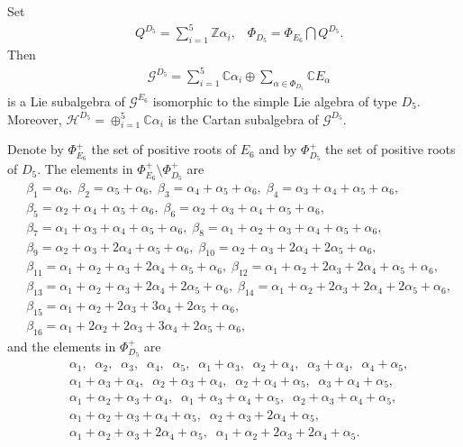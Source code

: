 \documentclass[12pt]{article}
\numberwithin{equation}{section}
\theoremstyle{definition}
\theoremstyle{remark}
\begin{document}
Set
\begin{eqnarray}
	&Q^{D_5}=\sum\limits_{i=1}^5\mathbb{Z}\alpha_i,\;\;\;\Phi_{D_5}=\Phi_{E_6}\bigcap Q^{D_5}.
\end{eqnarray}
Then
\begin{eqnarray}
	&\mathscr{G}^{D_5}=\sum\limits_{i=1}^5\mathbb{C}\alpha_i\oplus\sum\limits_{\alpha\in\Phi_{D_5}}\mathbb{C}E_{\alpha}
\end{eqnarray}
is a Lie subalgebra of $\mathscr{G}^{E_6}$ isomorphic to the simple Lie algebra of type $D_5$. Moreover, $\mathscr{H}^{D_5}=\oplus_{i=1}^5\mathbb{C}\alpha_i$ is the Cartan subalgebra of $\mathscr{G}^{D_5}$.

Denote by $\Phi_{E_6}^+$ the set of positive roots of $E_6$ and by $\Phi_{D_5}^+$ the set of positive roots of $D_5$. The elements in $\Phi^+_{E_6}\setminus\Phi^+_{D_5}$ are
\begin{eqnarray}
	&\beta_1=\alpha_6,\;\beta_2=\alpha_5+\alpha_6,\;\beta_3=\alpha_4+\alpha_5+\alpha_6,\;\beta_4=\alpha_3+\alpha_4+\alpha_5+\alpha_6,\label{2.29}\\
	&\beta_5=\alpha_2+\alpha_4+\alpha_5+\alpha_6,\;\beta_6=\alpha_2+\alpha_3+\alpha_4+\alpha_5+\alpha_6,\\
	&\beta_7=\alpha_1+\alpha_3+\alpha_4+\alpha_5+\alpha_6,\;\beta_8=\alpha_1+\alpha_2+\alpha_3+\alpha_4+\alpha_5+\alpha_6,\\
	&\beta_9=\alpha_2+\alpha_3+2\alpha_4+\alpha_5+\alpha_6,\;\beta_{10}=\alpha_2+\alpha_3+2\alpha_4+2\alpha_5+\alpha_6,\\
	&\beta_{11}=\alpha_1+\alpha_2+\alpha_3+2\alpha_4+\alpha_5+\alpha_6,\;\beta_{12}=\alpha_1+\alpha_2+2\alpha_3+2\alpha_4+\alpha_5+\alpha_6,\\
	&\beta_{13}=\alpha_1+\alpha_2+\alpha_3+2\alpha_4+2\alpha_5+\alpha_6,\;\beta_{14}=\alpha_1+\alpha_2+2\alpha_3+2\alpha_4+2\alpha_5+\alpha_6,\\
	&\beta_{15}=\alpha_1+\alpha_2+2\alpha_3+3\alpha_4+2\alpha_5+\alpha_6,\\
	&\beta_{16}=\alpha_1+2\alpha_2+2\alpha_3+3\alpha_4+2\alpha_5+\alpha_6,
\end{eqnarray}
and the elements in $\Phi^+_{D_5}$ are
\begin{eqnarray}
	&\alpha_1,\;\;\alpha_2,\;\;\alpha_3,\;\;\alpha_4,\;\;\alpha_5,\;\;\alpha_1+\alpha_3,\;\;\alpha_2+\alpha_4,\;\;\alpha_3+\alpha_4,\;\;\alpha_4+\alpha_5,\label{2.38}\\
	&\alpha_1+\alpha_3+\alpha_4,\;\;\alpha_2+\alpha_3+\alpha_4,\;\;\alpha_2+\alpha_4+\alpha_5,\;\;\alpha_3+\alpha_4+\alpha_5,\\
	&\alpha_1+\alpha_2+\alpha_3+\alpha_4,\;\;\alpha_1+\alpha_3+\alpha_4+\alpha_5,\;\;\alpha_2+\alpha_3+\alpha_4+\alpha_5,\\
	&\alpha_1+\alpha_2+\alpha_3+\alpha_4+\alpha_5,\;\;\alpha_2+\alpha_3+2\alpha_4+\alpha_5,\\
	&\alpha_1+\alpha_2+\alpha_3+2\alpha_4+\alpha_5,\;\;\alpha_1+\alpha_2+2\alpha_3+2\alpha_4+\alpha_5.\label{2.42}
\end{eqnarray}
\end{document}
